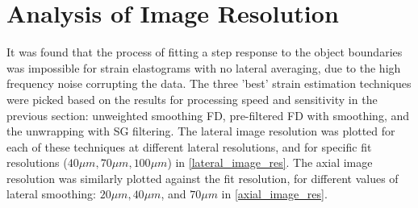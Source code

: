 \section{Analysis of Image Resolution} \label{image_res_results}
It was found that the process of fitting a step response to the object boundaries was impossible for strain elastograms with no lateral averaging, due to the high frequency noise corrupting the data. The three 'best' strain estimation techniques were picked based on the results for processing speed and sensitivity in the previous section: unweighted smoothing FD, pre-filtered FD with smoothing, and the unwrapping with SG filtering. The lateral image resolution was plotted for each of these techniques at different lateral resolutions, and for specific fit resolutions ($40\mu m, 70 \mu m, 100\mu m$) in \autoref{lateral_image_res}. The axial image resolution was similarly plotted against the fit resolution, for different values of lateral smoothing: $20\mu m, 40\mu m$, and $70\mu m$ in \autoref{axial_image_res}.
